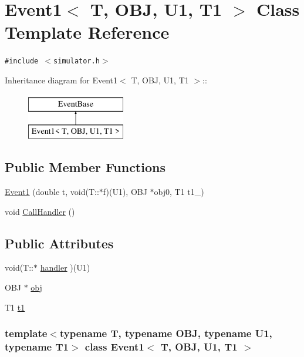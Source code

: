 \hypertarget{classEvent1}{
\section{Event1$<$ T, OBJ, U1, T1 $>$ Class Template Reference}
\label{classEvent1}
}
{\tt \#include $<$simulator.h$>$}

Inheritance diagram for Event1$<$ T, OBJ, U1, T1 $>$::\begin{figure}[H]
\begin{center}
\leavevmode
\includegraphics[height=2cm]{classEvent1}
\end{center}
\end{figure}
\subsection*{Public Member Functions}
\begin{CompactItemize}
\item 
\hyperlink{classEvent1_e53edac1393d2f7920f936ba6c7f90ba}{Event1} (double t, void(T::$\ast$f)(U1), OBJ $\ast$obj0, T1 t1\_)
\item 
void \hyperlink{classEvent1_6d7e716e16ab6ee6672807250860cdd8}{CallHandler} ()
\end{CompactItemize}
\subsection*{Public Attributes}
\begin{CompactItemize}
\item 
void(T::$\ast$ \hyperlink{classEvent1_2a02ab5cbd37a2879c3db25cf3faf80f}{handler} )(U1)
\item 
OBJ $\ast$ \hyperlink{classEvent1_dc793df07c00b32a012cf45b31b9d2e6}{obj}
\item 
T1 \hyperlink{classEvent1_1af2759e05940a423f3b9409feab75f9}{t1}
\end{CompactItemize}
\subsubsection*{template$<$typename T, typename OBJ, typename U1, typename T1$>$ class Event1$<$ T, OBJ, U1, T1 $>$}



